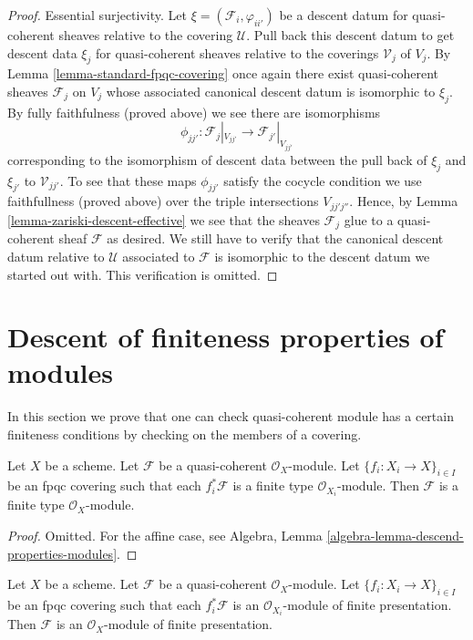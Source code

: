 \begin{proof}
\medskip\noindent
Essential surjectivity. Let $\xi = (\mathcal{F}_i, \varphi_{ii'})$
be a descent datum for quasi-coherent sheaves relative to the covering
$\mathcal{U}$. Pull back this descent datum to get descent data
$\xi_j$ for quasi-coherent sheaves relative to the coverings
$\mathcal{V}_j$ of $V_j$. By Lemma \ref{lemma-standard-fpqc-covering}
once again there exist
quasi-coherent sheaves $\mathcal{F}_j$ on $V_j$ whose associated
canonical descent datum is isomorphic to $\xi_j$. By fully faithfulness
(proved above) we see there are isomorphisms
$$
\phi_{jj'} :
\mathcal{F}_j|_{V_{jj'}}
\longrightarrow
\mathcal{F}_{j'}|_{V_{jj'}}
$$
corresponding to the isomorphism of descent data between the pull back
of $\xi_j$ and $\xi_{j'}$ to $\mathcal{V}_{jj'}$. To see that these
maps $\phi_{jj'}$ satisfy the cocycle condition we use faithfullness
(proved above) over the triple intersections $V_{jj'j''}$. Hence, by
Lemma \ref{lemma-zariski-descent-effective}
we see that the sheaves $\mathcal{F}_j$
glue to a quasi-coherent sheaf $\mathcal{F}$ as desired.
We still have to verify that the canonical descent datum relative to
$\mathcal{U}$ associated to $\mathcal{F}$ is isomorphic to the descent
datum we started out with. This verification is omitted.
\end{proof}


\section{Descent of finiteness properties of modules}
\label{section-descent-finiteness}

\noindent
In this section we prove that one can check quasi-coherent module
has a certain finiteness conditions by checking on the members of
a covering.

\begin{lemma}
\label{lemma-finite-type-descends}
Let $X$ be a scheme.
Let $\mathcal{F}$ be a quasi-coherent $\mathcal{O}_X$-module.
Let $\{f_i : X_i \to X\}_{i \in I}$ be an fpqc covering such that
each $f_i^*\mathcal{F}$ is a finite type $\mathcal{O}_{X_i}$-module.
Then $\mathcal{F}$ is a finite type $\mathcal{O}_X$-module.
\end{lemma}

\begin{proof}
Omitted. For the affine case, see
Algebra, Lemma \ref{algebra-lemma-descend-properties-modules}.
\end{proof}

\begin{lemma}
\label{lemma-finite-presentation-descends}
Let $X$ be a scheme.
Let $\mathcal{F}$ be a quasi-coherent $\mathcal{O}_X$-module.
Let $\{f_i : X_i \to X\}_{i \in I}$ be an fpqc covering such that
each $f_i^*\mathcal{F}$ is an $\mathcal{O}_{X_i}$-module of finite
presentation. Then $\mathcal{F}$ is an $\mathcal{O}_X$-module
of finite presentation.
\end{lemma}

